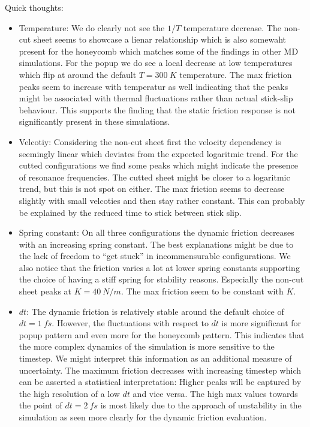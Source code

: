 Quick thoughts:
\begin{itemize}
  \item Temperature: We do clearly not see the $1/T$ temperature decrease. The non-cut sheet seems to showcase a lienar relationship which is also somewaht present for the honeycomb which matches some of the findings in other MD simulations. For the popup we do see a local decrease at low temperatures which flip at around the default $T = \SI{300}{K}$ temperature. The max friction peaks seem to increase with temperatur as well indicating that the peaks might be associated with thermal fluctuations rather than actual stick-slip behaviour. This supports the finding that the static friction response is not significantly present in these simulations. 
  \item Velcotiy: Considering the non-cut sheet first the velocity dependency is seemingly linear which deviates from the expected logaritmic trend. For the cutted configurations we find some peaks which might indicate the presence of resonance frequencies. The cutted sheet might be closer to a logaritmic trend, but this is not spot on either. The max friction seems to decrease slightly with small velcoties and then stay rather constant. This can probably be explained by the reduced time to stick between stick slip. 
  \item Spring constant: On all three configurations the dynamic friction decreases with an increasing spring constant. The best explanations might be due to the lack of freedom to ``get stuck'' in incommensurable configurations. We also notice that the friction varies a lot at lower spring constants supporting the choice of having a stiff spring for stability reasons. Especially the non-cut sheet peaks at $K = \SI{40}{N/m}$. The max friction seem to be constant with $K$.
  \item $dt$: The dynamic friction is relatively stable around the default choice of $dt = \SI{1}{fs}$. However, the fluctuations with respect to $dt$ is more significant for popup pattern and even more for the honeycomb pattern. This indicates that the more complex dynamics of the simulation is more sensitive to the timestep. We might interpret this information as an additional measure of uncertainty. The maximum friction decreases with increasing timestep which can be asserted a statistical interpretation: Higher peaks will be captured by the high resolution of a low $dt$ and vice versa. The high max values towards the point of $dt = \SI{2}{fs}$ is most likely due to the approach of unstability in the simulation as seen more clearly for the dynamic friction evaluation. 
\end{itemize}


